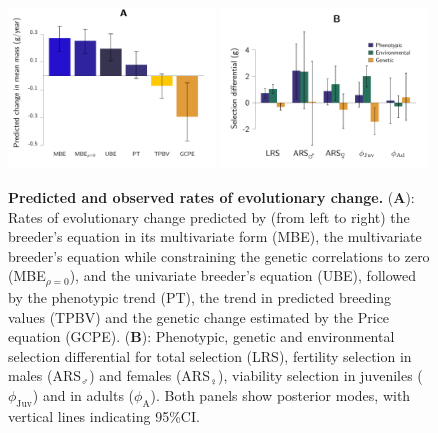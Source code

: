 \begin{figure}[ht]
{\centering
\includegraphics[width=0.49\textwidth]{FiguresStasis/AllChangeMass-1}
\includegraphics[width=0.49\textwidth]{FiguresStasis/SelectionS-1}
}
\caption{\footnotesize \textbf{Predicted and observed rates of evolutionary change.} (\textbf{A}): Rates of evolutionary change predicted by (from left to right) the breeder's equation in its multivariate form (MBE), the multivariate breeder's equation while constraining the genetic correlations to zero (MBE$_{\rho=0}$), and the univariate breeder's equation (UBE), followed by the phenotypic trend (PT), the trend in predicted breeding values (TPBV) and the genetic change estimated by the Price equation (GCPE). (\textbf{B}): Phenotypic, genetic and environmental selection differential for total selection (LRS), fertility selection in males (ARS$_{\male}$) and females (ARS$_{\female}$), viability selection in juveniles ($\phi_\mathrm{Juv}$) and in adults ($\phi_\mathrm{A}$). Both panels show posterior modes, with vertical lines indicating 95\%CI.}
\label{fig:gch}
\end{figure}


